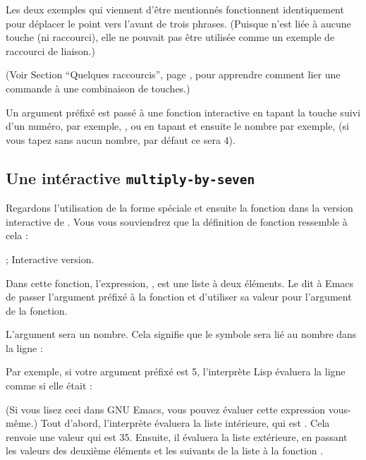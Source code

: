 Les deux exemples qui viennent d'être mentionnés fonctionnent
identiquement pour déplacer le point vers l'avant de trois
phrases. (Puisque  n'est liée à aucune touche
(ni raccourci), elle ne pouvait pas être utilisée comme un exemple de
raccourci de liaison.)

(Voir Section  ``Quelques raccourcis'', page
, pour apprendre comment lier une commande à une
combinaison de touches.)

Un argument préfixé est passé à une fonction interactive en tapant la
touche  suivi d'un numéro, par exemple, , ou en
tapant  et ensuite le nombre par exemple,  (si
vous tapez  sans aucun nombre, par défaut ce sera 4). 


\subsection{Une intéractive
  \texttt{multiply-by-seven}}
Regardons l'utilisation de la forme spéciale  et
ensuite la fonction  dans la version interactive de
. Vous vous souviendrez que la définition de
fonction ressemble à cela :

    ; Interactive version.




Dans cette fonction, l'expression, , est une
liste à deux éléments. Le  dit à Emacs de passer l'argument
préfixé à la fonction et d'utiliser sa valeur pour l'argument de la
fonction. 

L'argument sera un nombre. Cela signifie que le symbole 
sera lié au nombre dans la ligne :


Par exemple, si votre argument préfixé est 5, l'interprète Lisp
évaluera la ligne comme si elle était :


(Si vous lisez ceci dans GNU Emacs, vous pouvez évaluer cette
expression vous-même.) Tout d'abord, l'interprète évaluera la liste
intérieure, qui est . Cela renvoie une valeur qui est
35. Ensuite, il évaluera la liste extérieure, en passant les valeurs
des deuxième éléments et les suivants de la liste à la fonction
.

